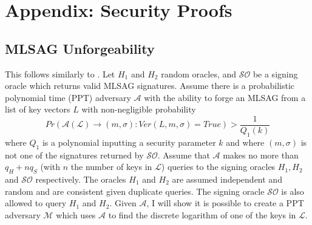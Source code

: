 \documentclass[12pt,english]{mrl}
\theoremstyle{definition}
\numberwithin{equation}{section}
\numberwithin{figure}{section}
\numberwithin{equation}{section}
\numberwithin{equation}{section}
\numberwithin{figure}{section}
\begin{document}



\appendix

\section{Appendix: Security Proofs}

\subsection{MLSAG Unforgeability}

This follows similarly to \cite[Theorem 1]{LWW}. Let $H_{1}$ and
$H_{2}$ random oracles, and $\mathcal{SO}$ be a signing oracle which
returns valid MLSAG signatures. Assume there is a probabilistic polynomial
time (PPT) adversary $\mathcal{A}$ with the ability to forge an MLSAG
from a list of key vectors $L$ with non-negligible probability 
\[
Pr\left(\mathcal{A}\left(\mathcal{L}\right)\to\left(m,\sigma\right):Ver\left(L,m,\sigma\right)=True\right)>\frac{1}{Q_{1}\left(k\right)}
\]
 where $Q_{1}$ is a polynomial inputting a security parameter $k$
and where $\left(m,\sigma\right)$ is not one of the signatures returned
by $\mathcal{S}\mathcal{O}$. Assume that $\mathcal{A}$ makes no
more than $q_{H}+nq_{S}$ (with $n$ the number of keys in $\mathcal{L}$)
queries to the signing oracles $H_{1},H_{2}$ and $\mathcal{SO}$
respectively. The oracles $H_{1}$ and $H_{2}$ are assumed independent
and random and are consistent given duplicate queries. The signing
oracle $\mathcal{SO}$ is also allowed to query $H_{1}$ and $H_{2}$.
Given $\mathcal{A}$, I will show it is possible to create a PPT adversary
$\mathcal{M}$ which uses $\mathcal{A}$ to find the discrete logarithm
of one of the keys in $\mathcal{L}$. 
\end{document}
